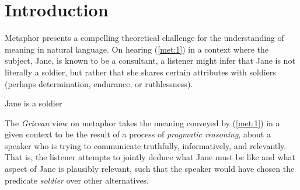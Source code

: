 \documentclass[OpenMind]{stjour}
\begin{document}
\begin{abstract}

	\end{abstract}
\section{Introduction}

	Metaphor presents a compelling theoretical challenge for the understanding of meaning in natural language. On hearing (\ref{met:1}) in a context where the subject, Jane, is known to be a consultant, a listener might infer that Jane is not literally a soldier, but rather that she shares certain attributes with soldiers (perhaps determination, endurance, or ruthlessness). 
	\begin{exe}
	\vspace{-1.0em}
	\ex Jane is a soldier \label{met:1}
	\end{exe}
	The \emph{Gricean} view on metaphor takes the meaning conveyed by (\ref{met:1}) in a given context to be the result of a process of \emph{pragmatic reasoning}, about a speaker who is trying to communicate truthfully, informatively, and relevantly. That is, the listener attempts to jointly deduce what Jane must be like and what aspect of Jane is plausibly relevant, such that the speaker would have chosen the predicate \emph{soldier} over other alternatives.

\end{document}
